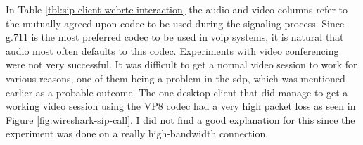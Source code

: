 \begin{table}[h]
\caption{WebRTC client interaction with SIP desktop clients using the webrtc2sip gateway.}
\label{tbl:sip-client-webrtc-interaction}
\end{table}

In Table \ref{tbl:sip-client-webrtc-interaction} the audio and video columns refer to the mutually agreed upon codec to be used during the signaling process. Since g.711 is the most preferred codec to be used in \gls{voip} systems, it is natural that audio most often defaults to this codec. Experiments with video conferencing were not very successful. It was difficult to get a normal video session to work for various reasons, one of them being a problem in the \gls{sdp}, which was mentioned earlier as a probable outcome. The one desktop client that did manage to get a working video session using the VP8 codec had a very high packet loss as seen in Figure \ref{fig:wireshark-sip-call}. I did not find a good explanation for this since the experiment was done on a really high-bandwidth connection.

